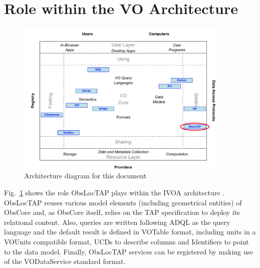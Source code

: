 \documentclass[11pt,a4paper]{ivoa}
\begin{document}
\section*{Role within the VO Architecture}


\begin{figure}
\centering


\includegraphics[width=0.9\textwidth]{role_diagram.pdf}
\caption{Architecture diagram for this document}
\label{fig:archdiag}
\end{figure}


Fig.~\ref{fig:archdiag} shows the role ObsLocTAP plays within the
IVOA architecture \citep{note:VOARCH}. ObsLocTAP reuses various model elements (including geometrical entities) of ObsCore and, 
as ObsCore itself, relies on the TAP specification to deploy its relational content.
Also, queries are written following ADQL as the query language and the default result is defined
in VOTable format, including units in a VOUnits compatible format, UCDs to
describe columns and Identifiers to point to the data model. Finally, ObsLocTAP
services can be registered by making use of the VODataService standard format.

\pagebreak
\end{document}
